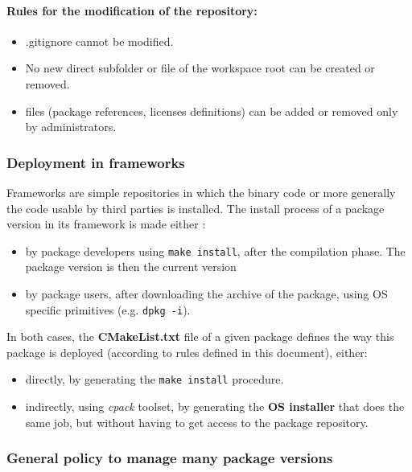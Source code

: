 \documentclass[12pt,a4paper]{article}
\begin{document}
\paragraph{Rules for the modification of the repository:}
\begin{itemize}
\item .gitignore cannot be modified.
\item No new direct subfolder or file of the workspace root can be created or removed.
\item files (package references, licenses definitions) can be added or removed only by administrators.
\end{itemize}

\subsubsection{Deployment in frameworks}

Frameworks are simple repositories in which the binary code or more generally the code usable by third parties is installed. The install process of a package  version in its framework is made either :
\begin{itemize}
\item by package developers using \texttt{make install}, after the compilation phase. The package version is then the current version
\item by package users, after downloading the archive of the package, using OS specific primitives (e.g. \texttt{dpkg -i}).
\end{itemize}
In both cases, the \textbf{CMakeList.txt} file of a given package defines the way this package is deployed (according to rules defined in this document), either:
\begin{itemize}
\item directly, by generating the \texttt{make install} procedure.
\item indirectly, using \textit{cpack} toolset, by generating the \textbf{OS installer} that does the same job, but without having to get access to the package repository.
\end{itemize}


\subsubsection{General policy to manage many package versions}
\end{document}
